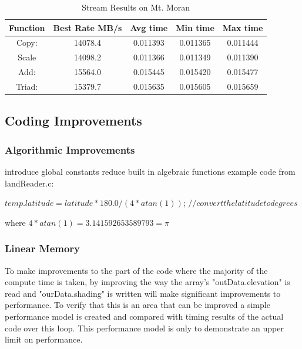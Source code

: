 \documentclass[]{article}%
\begin{document}
\begin{table}[ht]
\caption{Stream Results on Mt. Moran}
\centering
\begin{tabular}{c c  c c c}
\hline\hline
\hline
Function   & Best Rate MB/s & Avg time  &   Min time &    Max time \\ [0.5ex] 
\hline

Copy:    &     14078.4    & 0.011393    & 0.011365     & 0.011444\\
Scale     &  14098.2    & 0.011366     & 0.011349    & 0.011390\\
Add:      & 15564.0    & 0.015445     & 0.015420     & 0.015477\\
Triad:    & 15379.7    & 0.015635     & 0.015605     & 0.015659\\

\hline
\end{tabular}
\label{table:STREAM}
\end{table} 


\subsection{Coding Improvements}

\subsubsection{Algorithmic Improvements}
introduce global constants
reduce built in algebraic functions
example code from landReader.c:

$temp.latitude = latitude*180.0/(4*atan(1))$;	$//convert the latitude to degrees	$

where $4*atan(1) = 3.141592653589793 = \pi$

\subsubsection{Linear Memory}

To make improvements to the part of the code where the majority of the compute time is taken, by improving the way the array's "outData.elevation" is read and "ourData.shading" is written will make significant improvements to performance. To verify that this is an area that can be improved a simple performance model is created and compared with timing results of the actual code over this loop. This performance model is only to demonstrate an upper limit on performance.
\end{document}
